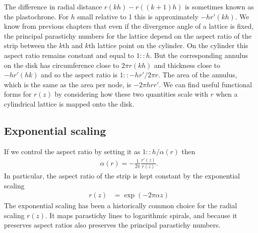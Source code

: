 	
The difference in radial distance $r(kh)-r((k+1)h)$ is sometimes known as the plastochrone. For $h$ small relative to 1 this is approximately $-hr'(kh)$.  We know from previous chapters that even if the divergence angle of a lattice is fixed, the principal parastichy numbers for the lattice depend on the aspect ratio of the strip between the $k$th and $k$th lattice point on the cylinder. On the cylinder this aspect ratio remains constant and equal to $1::h$. But the corresponding annulus on the disk has circumference close to $2\pi r(kh)$ and thickness close to $-hr'(hk)$ and so the aspect ratio is $1::-hr'/2\pi r$. The area of the annulus, which is the same as the area per node, is $-2\pi h  r r'$. 
We can find useful functional forms for $r(z)$ by considering how these two quantities scale with $r$ when a cylindrical lattice is mapped onto the disk.
\subsection{Exponential scaling}
 If we control the aspect ratio by setting it as  $1:: h/\alpha(r)$ then
\begin{align}
\alpha(r) = -\frac{1}{2\pi}\frac{r'(z)}{r(z)}.
\end{align}
In particular, the aspect ratio of the strip is kept constant by the exponential scaling
\begin{align}
{r(z)} &= \exp(-2\pi\alpha z)
\end{align}
The exponential scaling has been a historically common choice for the radial scaling $r(z)$. It maps parastichy lines to logarithmic spirals, and because it preserves aspect ratios also preserves the principal parastichy numbers. 

